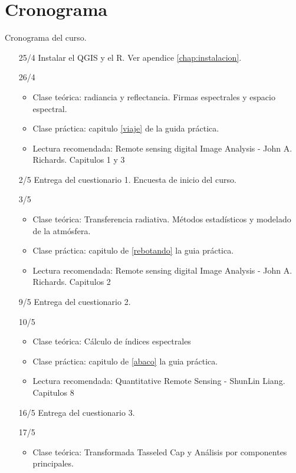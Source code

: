 \chapter{Cronograma}\label{chap:cronograma}

Cronograma del curso.

\begin{itemize}
  \item[25/4] Instalar el QGIS y el R. Ver apendice \ref{chap:instalacion}.
  \item[26/4] 
  \begin{itemize}
    \item Clase te\'orica: radiancia y reflectancia. Firmas espectrales y espacio espectral.
    \item Clase pr\'actica: capitulo \ref{viaje} de la guida pr\'actica.
    \item Lectura recomendada: Remote sensing digital Image Analysis - John A. Richards. Capitulos 1 y 3
  \end{itemize}
  \item[2/5] Entrega del cuestionario 1. Encuesta de inicio del curso.
  \item[3/5] 
  \begin{itemize}
    \item Clase te\'orica: Transferencia radiativa. M\'etodos estad\'isticos y modelado de la atm\'osfera.
    \item Clase pr\'actica: capitulo de \ref{rebotando} la guia pr\'actica.
    \item Lectura recomendada: Remote sensing digital Image Analysis - John A. Richards. Capitulos 2
  \end{itemize}
  \item[9/5] Entrega del cuestionario 2.
  \item[10/5] 
  \begin{itemize}
    \item Clase te\'orica: C\'alculo de \'indices espectrales
    \item Clase pr\'actica: capitulo de \ref{abaco} la guia pr\'actica.
    \item Lectura recomendada: Quantitative Remote Sensing - ShunLin Liang. Capitulos 8
  \end{itemize}
  \item[16/5] Entrega del cuestionario 3.
  \item[17/5] 
  \begin{itemize}
    \item Clase te\'orica: Transformada Tasseled Cap y An\'alisis por componentes principales.

\end{itemize}
\end{itemize}
